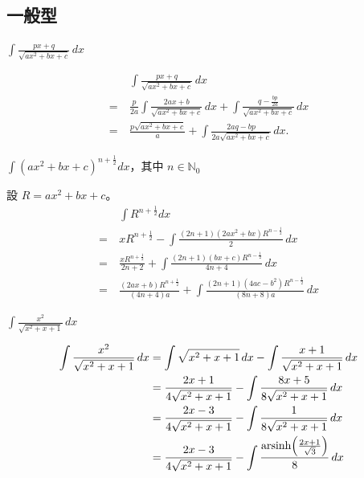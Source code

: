 \documentclass{beamer}
\newcommand{\Left} {\mathopen{}\mathclose\bgroup\left}
\newcommand{\Right}{\aftergroup\egroup\right}
\newcommand  {\N}{\mathbb N}
\newcommand{\arsinh}{\operatorname{arsinh}}
\theoremstyle{remark}
\begin{document}
\begin{CJK}{UTF8}{bsmi}
\subsection{一般型}
\begin{frame}{$\displaystyle \int \frac{px + q}{\sqrt{ax^2 + bx + c}}\,dx$}
  \begin{solution}
    \begin{align*}
	 & \int \frac{px + q}{\sqrt{ax^2 + bx + c}}\,dx\\
      =\:& \frac{p}{2a} \int \frac{2ax + b}{\sqrt{ax^2 + bx + c}}\,dx
	   +\int \frac{q - \frac{bp}{2a}}{\sqrt{ax^2 + bx + c}}\,dx\\
      =\:& \frac{p \sqrt{ax^2 + bx + c}}{a} + \int \frac{2aq - bp}{2a \sqrt{ax^2 + bx + c}}\,dx.
    \end{align*}
  \end{solution}
\end{frame}

\begin{frame}{$\displaystyle \int \left( ax^2 + bx + c \right)^{n + \frac12} dx$，其中 $n \in \N_0$}
  \begin{solution}
    設 $R = ax^2 + bx + c$。
    \begin{align*}
	 & \int R^{n + \frac12} dx\\
      =\:& x R^{n + \frac12}
	   -\int \frac{\left( 2n + 1 \right) \left( 2ax^2 + bx \right) R^{n - \frac12}}{2}\,dx\\
      =\:& \frac{x R^{n + \frac12}}{2n + 2}
	   +\int \frac{\left( 2n + 1 \right) \left( bx + c \right) R^{n - \frac12}}{4n + 4}\,dx\\
      =\:& \frac{\left( 2ax + b \right) R^{n + \frac12}}{\left( 4n+4 \right) a}
	   +\int \frac{\left( 2n + 1 \right) \left( 4ac - b^2 \right) R^{n - \frac12}}{\left( 8n+8 \right) a}\,dx
    \end{align*}
  \end{solution}
\end{frame}

\begin{frame}{$\displaystyle \int \frac{x^2}{\sqrt{x^2 + x + 1}}\,dx$}
  \begin{solution}
    \begin{align*}
      \int \frac{x^2}{\sqrt{x^2 + x + 1}}\,dx &= \int \sqrt{x^2 + x + 1}\,dx - \int \frac{x + 1}{\sqrt{x^2 + x + 1}}\,dx\\
	&= \frac{2x + 1}{4 \sqrt{x^2 + x + 1}} - \int \frac{8x + 5}{8 \sqrt{x^2 + x + 1}}\,dx\\
	&= \frac{2x - 3}{4 \sqrt{x^2 + x + 1}} - \int \frac{1}{8 \sqrt{x^2 + x + 1}}\,dx\\
	&= \frac{2x - 3}{4 \sqrt{x^2 + x + 1}} - \int \frac{\arsinh \Left( \frac{2x + 1}{\sqrt3} \Right)}{8}\,dx
    \end{align*}
  \end{solution}
\end{frame}


\end{CJK}
\end{document}
